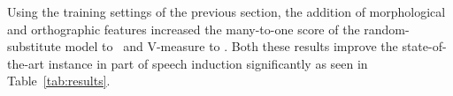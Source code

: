 Using the training settings of the previous section, the addition of
morphological and orthographic features increased the many-to-one score of the
random-substitute model to \fwsxymto\ and V-measure to \fwsxyvm.  Both these
results improve the state-of-the-art instance in part of speech induction
significantly as seen in Table~\ref{tab:results}.



